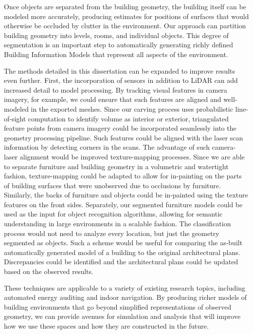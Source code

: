 \documentclass[12pt,onecolumn,oneside]{book}
\begin{document}
Once objects are separated from the building geometry, the building itself can be modeled more accurately, producing estimates for positions of surfaces that would otherwise be occluded by clutter in the environment.  Our approach can partition building geometry into levels, rooms, and individual objects.  This degree of segmentation is an important step to automatically generating richly defined Building Information Models that represent all aspects of the environment. 

The methods detailed in this dissertation can be expanded to improve results even further.  First, the incorporation of sensors in addition to LiDAR can add increased detail to model processing.  By tracking visual features in camera imagery, for example, we could ensure that such features are aligned and well-modeled in the exported meshes.  Since our carving process uses probabilistic line-of-sight computation to identify volume as interior or exterior, triangulated feature points from camera imagery could be incorporated seamlessly into the geometry processing pipeline.  Such features could be aligned with the laser scan information by detecting corners in the scans.  The advantage of such camera-laser alignment would be improved texture-mapping processes.  Since we are able to separate furniture and building geometry in a volumetric and watertight fashion, texture-mapping could be adapted to allow for in-painting on the parts of building surfaces that were unobserved due to occlusions by furniture.  Similarly, the backs of furniture and objects could be in-painted using the texture features on the front sides.  Separately, our segmented furniture models could be used as the input for object recognition algorithms, allowing for semantic understanding in large environments in a scalable fashion.  The classification process would not need to analyze every location, but just the geometry segmented as objects.  Such a scheme would be useful for comparing the as-built automatically generated model of a building to the original architectural plans.  Discrepancies could be identified and the architectural plans could be updated based on the observed results.

These techniques are applicable to a variety of existing research topics, including automated energy auditing and indoor navigation.  By producing richer models of building environments that go beyond simplified representations of observed geometry, we can provide avenues for simulation and analysis that will improve how we use these spaces and how they are constructed in the future.


%

\vfill

\end{document}
